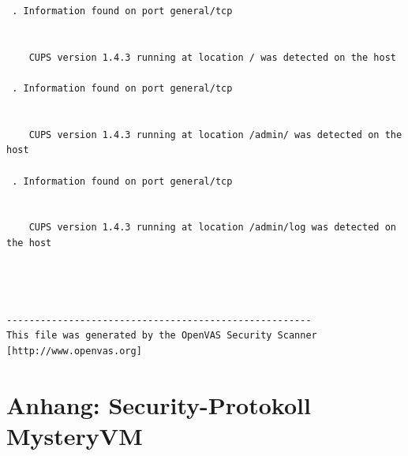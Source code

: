 \documentclass[twoside]{article}
\begin{document}
\begin{lstlisting}
 . Information found on port general/tcp


    CUPS version 1.4.3 running at location / was detected on the host

 . Information found on port general/tcp


    CUPS version 1.4.3 running at location /admin/ was detected on the host

 . Information found on port general/tcp


    CUPS version 1.4.3 running at location /admin/log was detected on the host




------------------------------------------------------
This file was generated by the OpenVAS Security Scanner [http://www.openvas.org]
\end{lstlisting}
\section*{Anhang: Security-Protokoll MysteryVM}
\label{secprotmvm}
\end{document}
